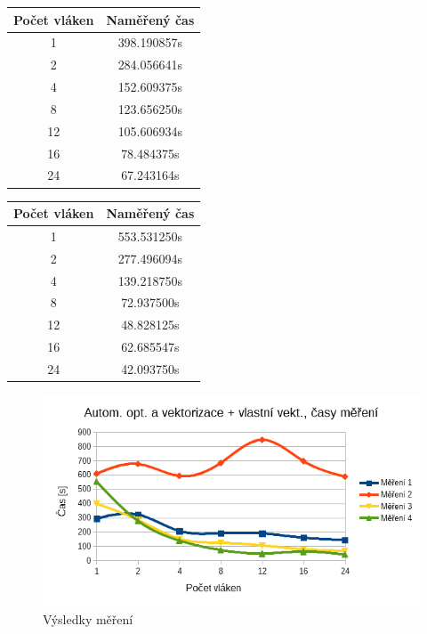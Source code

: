 \documentclass[12pt]{article}
\begin{document}
\begin{table}[H]
\parbox{.45\linewidth}{
%
%
\begin{center}
\begin{tabular}{ c | c }
\textbf{Počet vláken} & \textbf{Naměřený čas} \\ \hline \hline 
1 & 398.190857s \\ \hline
2 & 284.056641s \\ \hline
4 & 152.609375s \\ \hline
8 & 123.656250s \\ \hline
12 & 105.606934s \\ \hline
16 & 78.484375s \\ \hline
24 & 67.243164s \\ \hline
\end{tabular}
\end{center}
} \hfill
\parbox{.45\linewidth}{
%
%
\begin{center}
\begin{tabular}{ c | c }
\textbf{Počet vláken} & \textbf{Naměřený čas} \\ \hline \hline 
1 & 553.531250s \\ \hline
2 & 277.496094s \\ \hline
4 & 139.218750s \\ \hline
8 & 72.937500s \\ \hline
12 & 48.828125s \\ \hline
16 & 62.685547s \\ \hline
24 & 42.093750s \\ \hline
\end{tabular}
\end{center}
}
\end{table}

\begin{figure}[H]
  \begin{center}
     \includegraphics[width=12cm]{images/sdruzene/openmp/mantime.png}
    \caption{Výsledky měření} 
  \end{center}
\end{figure}
\end{document}
